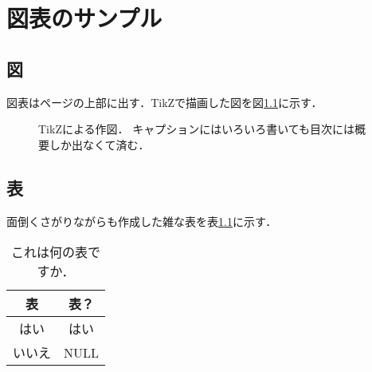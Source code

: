\chapter{図表のサンプル}

\section{図}
図表はページの上部に出す．TikZで描画した図を図\ref{fig:tikz}に示す．
\begin{figure}[t]
  \caption[TikZによる作図．]{
    TikZによる作図．
    キャプションにはいろいろ書いても目次には概要しか出なくて済む．
  }
  \label{fig:tikz}
  \centering
\end{figure}


\section{表}
面倒くさがりながらも作成した雑な表を表\ref{tab:what}に示す．
\begin{table}[t]
  \centering
  \begin{tabular}{cc}
    表 & 表？ \\ \hline
    はい & はい \\
    いいえ & NULL
  \end{tabular}
  \caption[謎の表．]{
    これは何の表ですか．\lipsum[2]
  }
  \label{tab:what}
\end{table}